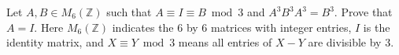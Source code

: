 Let $A, B \in M_6 (\mathbb{Z})$ such that $A \equiv I \equiv B \bmod 3$ and
$A^3 B^3 A^3 = B^3$. Prove that $A = I$. Here $M_6 (\mathbb{Z})$ indicates the
6 by 6 matrices with integer entries, $I$ is the identity matrix, and $X \equiv
Y \bmod 3$ means all entries of $X - Y$ are divisible by 3.
